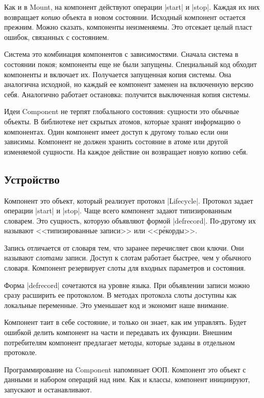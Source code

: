 Как и в Mount, на компонент действуют операции \spverb|start| и
\spverb|stop|. Каждая их них возвращает \emph{копию} объекта в новом
состоянии. Исходный компонент остается прежним. Можно сказать, компоненты
неизменяемы. Это отсекает целый пласт ошибок, связанных с состоянием.

Система это комбинация компонентов с зависимостями. Сначала система в состоянии
покоя; компоненты еще не были запущены. Специальный код обходит компоненты и
включает их. Получается запущенная копия системы. Она аналогична исходной, но
каждый ее компонент заменен на включенную версию себя. Аналогично работает
остановка: получится выключенная копия системы.

Идеи Component не терпят глобального состояния: сущности это обычные объекты. В
библиотеке нет скрытых атомов, которые хранят информацию о компонентах. Один
компонент имеет доступ к другому только если они зависимы. Компонент не должен
хранить состояние в атоме или другой изменяемой сущности. На каждое действие он
возвращает новую копию себя.

\subsection{Устройство}

Компонент это объект, который реализует протокол \spverb|Lifecycle|. Протокол
задает операции \spverb|start| и \spverb|stop|. Чаще всего компонент задают
типизированным словарем. Это сущность, которую объявляют формой
\spverb|defrecord|. По-другому их называют <<типизированные записи>> или
<<р\'{е}корды>>.

Запись отличается от словаря тем, что заранее перечисляет свои ключи. Они
называют \emph{слотами} записи. Доступ к слотам работает быстрее, чем у обычного
словаря. Компонент резервирует слоты для входных параметров и состояния.

Форма \spverb|defrecord| сочетаются на уровне языка. При объявлении записи можно
сразу расширить ее протоколом. В методах протокола слоты доступны как локальные
переменные. Это уменьшает код и экономит наше внимание.

Компонент таит в себе состояние, и только он знает, как им управлять. Будет
ошибкой делить компонент на части и передавать их функции. Внешним потребителям
компонент предлагает методы, которые заданы в отдельном протоколе.

Программирование на Component напоминает ООП. Компонент это объект с данными и
набором операций над ним. Как и классы, компонент инициируют, запускают и
останавливают.

